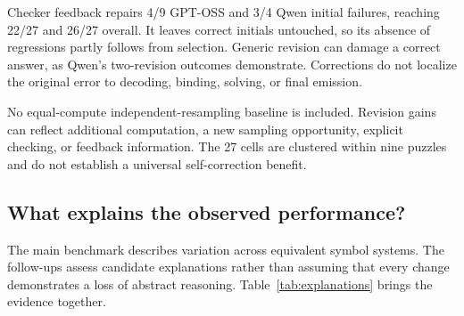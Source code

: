 \documentclass[11pt]{article}
\begin{document}
\begin{table}[t]
\centering\small

\caption{Revision from 27 shared initials per model on nine puzzles in three alphabets. New calls exclude the initial solve; cumulative latency includes it. Checker revision calls only on initially incorrect answers: nine for GPT-OSS and four for Qwen.}
\label{tab:revision}
\end{table}

Checker feedback repairs 4/9 GPT-OSS and 3/4 Qwen initial failures, reaching 22/27 and 26/27 overall. It leaves correct initials untouched, so its absence of regressions partly follows from selection. Generic revision can damage a correct answer, as Qwen's two-revision outcomes demonstrate. Corrections do not localize the original error to decoding, binding, solving, or final emission.

No equal-compute independent-resampling baseline is included. Revision gains can reflect additional computation, a new sampling opportunity, explicit checking, or feedback information. The 27 cells are clustered within nine puzzles and do not establish a universal self-correction benefit.

\subsection{What explains the observed performance?}
The main benchmark describes variation across equivalent symbol systems. The follow-ups assess candidate explanations rather than assuming that every change demonstrates a loss of abstract reasoning. Table~\ref{tab:explanations} brings the evidence together.
\end{document}
